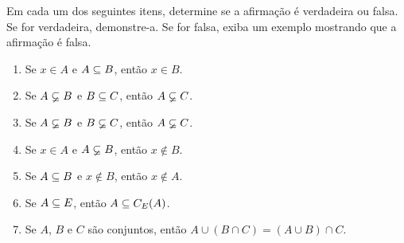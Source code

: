 \documentclass[12pt]{exam}
\begin{document}
    \vspace{.3cm}

    \questao{} Em cada um dos seguintes itens, determine se a afirma\c{c}\~ao \'e
    verdadeira ou falsa. Se for verdadeira, demonstre-a. Se for falsa, exiba um
    exemplo mostrando que a afirma\c{c}\~ao \'e falsa.
    \begin{enumerate}[label={\alph*})]
    \item Se $x \in A$ e $A \subseteq B$, ent\~ao $x \in B$.

    \item Se $A \varsubsetneq B$ e $B \subseteq C$, ent\~ao $A \varsubsetneq C$.

    \item Se $A \varsubsetneq B$ e $B \varsubsetneq C$, ent\~ao $A \varsubsetneq C$.

    \item Se $x \in A$ e $A \varsubsetneq B$, ent\~ao $x \notin B$.

    \item Se $A \subseteq B$ e $x \notin B$, ent\~ao $x \notin A$.

    \item Se $A \subseteq E$, ent\~ao $A \subseteq C_E(A)$.

    \item Se $A$, $B$ e $C$ s\~ao conjuntos, ent\~ao $A \cup (B \cap C) = (A \cup B) \cap C$.
    \end{enumerate}
\end{document}
